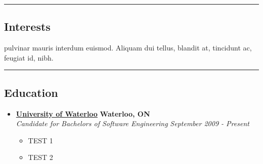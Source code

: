 \documentclass[10pt,letterpaper]{article}
\begin{document}
\hrule
\vspace{-0.4em}
\subsection*{Interests}

pulvinar mauris interdum euismod. Aliquam dui tellus, blandit at, tincidunt ac,
feugiat id, nibh.
\\

\hrule
\vspace{-0.4em}
\subsection*{Education}
  \begin{itemize}
    \parskip=-0.1em

    \item[]
    {\href{http://www.uwaterloo.ca}{\textbf{University of Waterloo}} \hfill
      \textbf{Waterloo, ON}}
    \\
    {\emph{Candidate for Bachelors of Software Engineering} \hfill
      \emph{September 2009 - Present}}

    \begin{itemize}[label=\textbullet]
      \item TEST 1
      \item TEST 2
    \end{itemize}
  \end{itemize}
\end{document}
